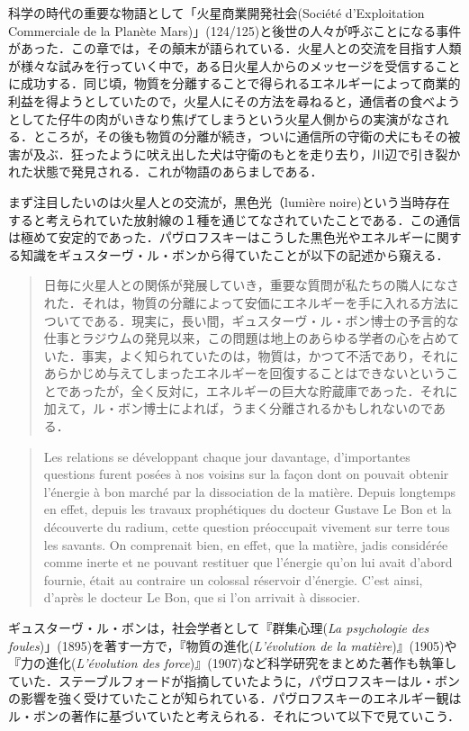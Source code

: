 科学の時代の重要な物語として「火星商業開発社会(Société d'Exploitation Commerciale de la Planète Mars)」(124/125)と後世の人々が呼ぶことになる事件があった．この章では，その顛末が語られている．火星人との交流を目指す人類が様々な試みを行っていく中で，ある日火星人からのメッセージを受信することに成功する．同じ頃，物質を分離することで得られるエネルギーによって商業的利益を得ようとしていたので，火星人にその方法を尋ねると，通信者の食べようとしてた仔牛の肉がいきなり焦げてしまうという火星人側からの実演がなされる．ところが，その後も物質の分離が続き，ついに通信所の守衛の犬にもその被害が及ぶ．狂ったように吠え出した犬は守衛のもとを走り去り，川辺で引き裂かれた状態で発見される．これが物語のあらましである．

まず注目したいのは火星人との交流が，黒色光（lumière noire)という当時存在すると考えられていた放射線の１種を通じてなされていたことである．この通信は極めて安定的であった．パヴロフスキーはこうした黒色光やエネルギーに関する知識をギュスターヴ・ル・ボンから得ていたことが以下の記述から窺える．

\begin{quote}
日毎に火星人との関係が発展していき，重要な質問が私たちの隣人になされた．それは，物質の分離によって安価にエネルギーを手に入れる方法についてである．現実に，長い間，ギュスターヴ・ル・ボン博士の予言的な仕事とラジウムの発見以来，この問題は地上のあらゆる学者の心を占めていた．事実，よく知られていたのは，物質は，かつて不活であり，それにあらかじめ与えてしまったエネルギーを回復することはできないということであったが，全く反対に，エネルギーの巨大な貯蔵庫であった．それに加えて，ル・ボン博士によれば，うまく分離されるかもしれないのである．
\end{quote}
\begin{quote}
Les relations se développant chaque jour davantage, d'importantes questions furent posées à nos voisins sur la façon dont on pouvait obtenir l'énergie à bon marché par la dissociation de la matière. Depuis longtemps en effet, depuis les travaux prophétiques du docteur Gustave Le Bon et la découverte du radium, cette question préoccupait vivement sur terre tous les savants. On comprenait bien, en effet, que la matière, jadis considérée comme inerte et ne pouvant restituer que l'énergie qu'on lui avait d'abord fournie, était au contraire un colossal réservoir d'énergie. C'est ainsi, d'après le docteur Le Bon, que si l'on arrivait à dissocier.
\end{quote}

ギュスターヴ・ル・ボンは，社会学者として『群集心理(\emph{La psychologie des foules})」(1895)を著す一方で，『物質の進化(\emph{L'évolution de la matière})』(1905)や『力の進化(\emph{L'évolution des force})』(1907)など科学研究をまとめた著作も執筆していた．ステーブルフォードが指摘していたように，パヴロフスキーはル・ボンの影響を強く受けていたことが知られている．パヴロフスキーのエネルギー観はル・ボンの著作に基づいていたと考えられる．それについて以下で見ていこう．

